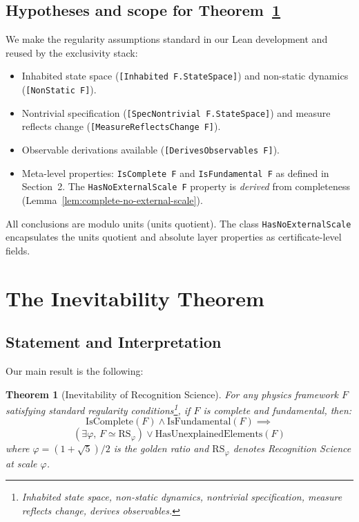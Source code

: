\documentclass[12pt]{article}
\newtheorem{theorem}{Theorem}[section]
\theoremstyle{remark}
\begin{document}
\subsection*{Hypotheses and scope for Theorem~\ref{thm:inevitability}}
We make the regularity assumptions standard in our Lean development and reused by the exclusivity stack:
\begin{itemize}
  \item Inhabited state space (\texttt{[Inhabited F.StateSpace]}) and non-static dynamics (\texttt{[NonStatic F]}).
  \item Nontrivial specification (\texttt{[SpecNontrivial F.StateSpace]}) and measure reflects change (\texttt{[MeasureReflectsChange F]}).
  \item Observable derivations available (\texttt{[DerivesObservables F]}).
  \item Meta-level properties: \texttt{IsComplete F} and \texttt{IsFundamental F} as defined in Section~2. The \texttt{HasNoExternalScale F} property is \emph{derived} from completeness (Lemma~\ref{lem:complete-no-external-scale}).
\end{itemize}
All conclusions are modulo units (units quotient). The class \texttt{HasNoExternalScale} encapsulates the units quotient and absolute layer properties as certificate-level fields.

\section{The Inevitability Theorem}

\subsection{Statement and Interpretation}

Our main result is the following:

\begin{theorem}[Inevitability of Recognition Science]\label{thm:inevitability}
For any physics framework $F$ satisfying standard regularity conditions\footnote{Inhabited state space, non-static dynamics, nontrivial specification, measure reflects change, derives observables.}, if $F$ is complete and fundamental, then:
\[
\mathrm{IsComplete}(F) \land \mathrm{IsFundamental}(F) \implies
\]
\[
\left(\exists \varphi,\, F \simeq \mathrm{RS}_\varphi\right) \lor \mathrm{HasUnexplainedElements}(F)
\]
where $\varphi = (1+\sqrt{5})/2$ is the golden ratio and $\mathrm{RS}_\varphi$ denotes Recognition Science at scale $\varphi$.
\end{theorem}
\end{document}
